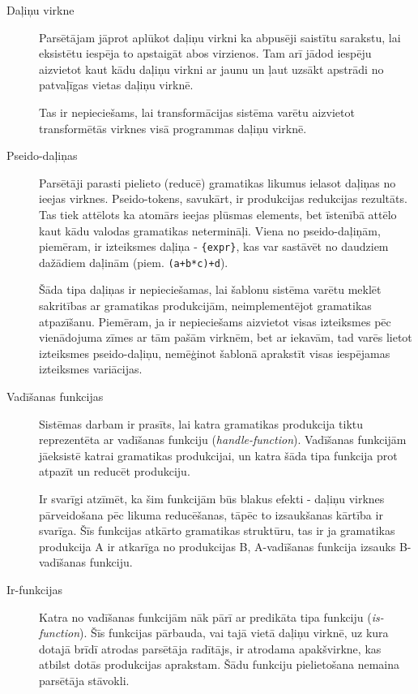 \begin{description}
\item[Daļiņu virkne]
Parsētājam jāprot aplūkot daļiņu virkni ka abpusēji saistītu sarakstu, lai eksistētu iespēja to apstaigāt abos virzienos. Tam arī jādod iespēju aizvietot kaut kādu daļiņu virkni ar jaunu un ļaut uzsākt apstrādi no patvaļīgas vietas daļiņu virknē.

Tas ir nepieciešams, lai transformācijas sistēma varētu aizvietot transformētās virknes visā programmas daļiņu virknē.

\item[Pseido-daļiņas]
Parsētāji parasti pielieto (reducē) gramatikas likumus ielasot daļiņas no ieejas virknes. Pseido-tokens, savukārt, ir produkcijas redukcijas rezultāts. Tas tiek attēlots ka atomārs ieejas plūsmas elements, bet īstenībā attēlo kaut kādu valodas gramatikas netermināļi. Viena no pseido-daļiņām, piemēram, ir izteiksmes daļiņa - \verb|{expr}|, kas var sastāvēt no daudziem dažādiem daļinām (piem. \verb|(a+b*c)+d|).

Šāda tipa daļiņas ir nepieciešamas, lai šablonu sistēma varētu meklēt sakritības ar gramatikas produkcijām, neimplementējot gramatikas atpazīšanu. Piemēram, ja ir nepieciešams aizvietot visas izteiksmes pēc vienādojuma zīmes ar tām pašām virknēm, bet ar iekavām, tad varēs lietot izteiksmes pseido-daļiņu, nemēģinot šablonā aprakstīt visas iespējamas izteiksmes variācijas.

\item[Vadīšanas funkcijas]
Sistēmas darbam ir prasīts, lai katra gramatikas produkcija tiktu reprezentēta ar vadīšanas funkciju (\emph{handle-function}). Vadīšanas funkcijām jāeksistē katrai gramatikas produkcijai, un katra šāda tipa funkcija prot atpazīt un reducēt produkciju.

Ir svarīgi atzīmēt, ka šim funkcijām būs blakus efekti - daļiņu virknes pārveidošana pēc likuma reducēšanas, tāpēc to izsaukšanas kārtība ir svarīga. Šīs funkcijas atkārto gramatikas struktūru, tas ir ja gramatikas produkcija A ir atkarīga no produkcijas B, A-vadīšanas funkcija izsauks B-vadīšanas funkciju.

\item[Ir-funkcijas]
Katra no vadīšanas funkcijām nāk pārī ar predikāta tipa funkciju (\emph{is-function}). Šīs funkcijas pārbauda, vai tajā vietā daļiņu virknē, uz kura dotajā brīdī atrodas parsētāja radītājs, ir atrodama apakšvirkne, kas atbilst dotās produkcijas aprakstam. Šādu funkciju pielietošana nemaina parsētāja stāvokli.


\end{description}
